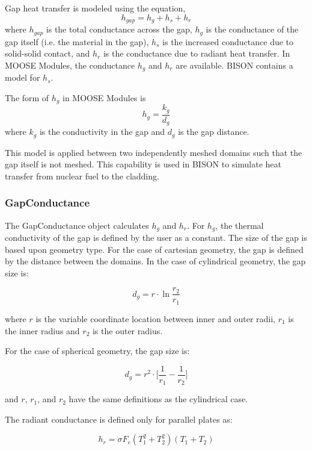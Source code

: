 \documentclass[preprint,5p]{elsarticle}
\begin{document}
Gap heat transfer is modeled using the
equation,
\begin{equation*}
h_{gap} = h_g + h_s + h_r
\end{equation*}
where $h_{gap}$ is the total conductance across the gap, $h_g$ is the conductance of the gap itself (i.e. the material in the gap), $h_s$ is the increased conductance due to solid-solid contact, and $h_r$ is the conductance due to radiant heat transfer.
In MOOSE Modules, the conductance $h_g$ and $h_r$ are available. BISON contains a model for $h_s$.

The form of $h_g$ in MOOSE Modules is
\begin{equation*}
h_g = \frac{k_g}{d_g}
\end{equation*}
where $k_g$ is the conductivity in the gap and $d_g$ is the gap distance.

This model is applied between two independently meshed domains such that the gap itself is not meshed. This capability is used in BISON to simulate heat transfer from nuclear fuel to the cladding.

\subsubsection{GapConductance}
The GapConductance object calculates $h_g$ and $h_r$. For $h_g$, the thermal conductivity of the gap is defined by the user as a constant. The size of the gap is based upon geometry type. For the case of cartesian geometry, the gap is defined by the distance between the domains. In the case of cylindrical geometry, the gap size is:

\begin{equation*}
d_g = r\cdot \ln \frac{r_2}{r_1}
\end{equation*}

where $r$ is the variable coordinate location between inner and outer radii, $r_1$ is the inner radius and $r_2$ is the outer radius.

For the case of spherical geometry, the gap size is:

\begin{equation*}
d_g = r^2\cdot \big[ \frac{1}{r_1} - \frac{1}{r_2} \big]
\end{equation*}

and $r$, $r_1$, and $r_2$ have the same definitions as the cylindrical case.

The radiant conductance is defined only for parallel plates as:

\begin{equation*}
h_r = \sigma F_e (T_1^2 + T_2^2)(T_1+T_2)
\end{equation*}
\end{document}
